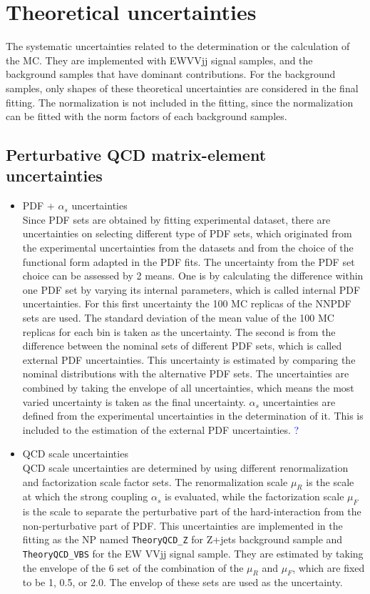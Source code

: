 \section{Theoretical uncertainties}
The systematic uncertainties related to the determination or the calculation of the MC.
They are implemented with EWVVjj signal samples, and the background samples that have dominant contributions. For the background samples, only shapes of these theoretical uncertainties are considered in the final fitting. The normalization is not included in the fitting, since the normalization can be fitted with the norm factors of each background samples.
\subsection{Perturbative QCD matrix-element uncertainties}
\begin{itemize}
\item PDF + $\alpha_s$ uncertainties\\
Since PDF sets are obtained by fitting experimental dataset, there are uncertainties on selecting different type of PDF sets, which originated from the experimental uncertainties from the datasets and from the choice of the functional form adapted in the PDF fits.
The uncertainty from the PDF set choice can be assessed by 2 means. One is by calculating the difference within one PDF set by varying its internal parameters, which is called internal PDF uncertainties. For this first uncertainty the 100 MC replicas of the NNPDF sets are used. The standard deviation of the mean value of the 100 MC replicas for each bin is taken as the uncertainty. The second is from the difference between the nominal sets of different PDF sets, which is called external PDF uncertainties. This uncertainty is estimated by comparing the nominal distributions with the alternative PDF sets. The uncertainties are combined by taking the envelope of all uncertainties, which means the most varied uncertainty is taken as the final uncertainty. 
$\alpha_s$ uncertainties are defined from the experimental uncertainties in the determination of it. This is included to the estimation of the external PDF uncertainties. \textcolor{blue}{?}
\item QCD scale uncertainties\\
QCD scale uncertainties are determined by using different renormalization and factorization scale factor sets. 
The renormalization scale $\mu_R$ is the scale at which the strong coupling $\alpha_s$ is evaluated, while the factorization scale $\mu_F$ is the scale to separate the perturbative part of the hard-interaction from the non-perturbative part of PDF. 
This uncertainties are implemented in the fitting as the NP named \texttt{TheoryQCD\_Z} for Z+jets background sample and \texttt{TheoryQCD\_VBS} for the EW VVjj signal sample. They are estimated by taking the envelope of the 6 set of the combination of the $\mu_R$ and $\mu_F$, which are fixed to be 1, 0.5, or 2.0. The envelop of these sets are used as the uncertainty.
\end{itemize}

